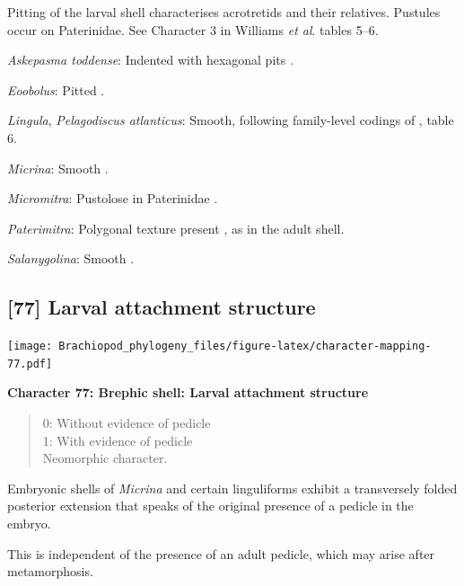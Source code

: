 \documentclass[openany]{book}
\theoremstyle{definition}
\theoremstyle{definition}
\theoremstyle{definition}
\theoremstyle{remark}
\begin{document}
Pitting of the larval shell characterises acrotretids and their
relatives. Pustules occur on Paterinidae. See Character 3 in Williams
\emph{et al}. \citeyearpar{Williams2000LinguliformeaCraniiformea} tables
5--6.

\hypertarget{Askepasma_toddense-coding-76}{}
\emph{Askepasma toddense}: Indented with hexagonal pits \citep[appendix
2]{Williams1998Thediversity}.

\hypertarget{Eoobolus-coding-76}{}
\emph{Eoobolus}: Pitted \citep[table
8]{Williams2000LinguliformeaCraniiformea}.

\hypertarget{Lingula-coding-76}{}
\emph{Lingula}, \emph{Pelagodiscus atlanticus}: Smooth, following
family-level codings of \citet{Williams2000LinguliformeaCraniiformea},
table 6.

\hypertarget{Micrina-coding-76}{}
\emph{Micrina}: Smooth \citep{Holmer2011Firstrecord}.

\hypertarget{Micromitra-coding-76}{}
\emph{Micromitra}: Pustolose in Paterinidae \citep[table
6]{Williams2000LinguliformeaCraniiformea}.

\hypertarget{Paterimitra-coding-76}{}
\emph{Paterimitra}: Polygonal texture present
\citep{Holmer2011Firstrecord}, as in the adult shell.

\hypertarget{Salanygolina-coding-76}{}
\emph{Salanygolina}: Smooth \citep{Holmer2009Theenigmatic}.

\subsection*{{[}77{]} Larval attachment
structure}\label{larval-attachment-structure}

\texttt{[image: Brachiopod\_phylogeny\_files/figure-latex/character-mapping-77.pdf]}

\textbf{Character 77: Brephic shell: Larval attachment structure}

\begin{quote}
0: Without evidence of pedicle\\
1: With evidence of pedicle\\
Neomorphic character.
\end{quote}

Embryonic shells of \emph{Micrina} and certain linguliforms exhibit a
transversely folded posterior extension that speaks of the original
presence of a pedicle in the embryo.

This is independent of the presence of an adult pedicle, which may arise
after metamorphosis.
\end{document}
